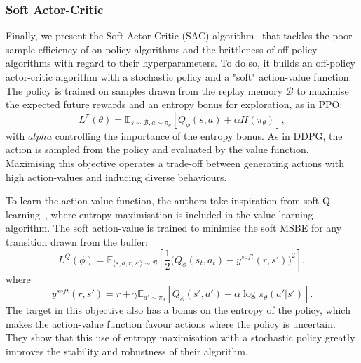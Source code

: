 \subsubsection{Soft Actor-Critic}\label{sec:DRL:SAC}

Finally, we present the Soft Actor-Critic (SAC) algorithm~\citep{Haarnoja2018_SAC} that tackles the poor sample efficiency of on-policy algorithms and the brittleness of off-policy algorithms with regard to their hyperparameters. To do so, it builds an off-policy actor-critic algorithm with a stochastic policy and a "soft" action-value function. The policy is trained on samples drawn from the replay memory $\mathcal{B}$ to maximise the expected future rewards and an entropy bonus for exploration, as in PPO:
\begin{equation}
    L^\pi(\theta)=\mathbb{E}_{s\sim\mathcal{B},a\sim\pi_\theta}\left[Q_\phi(s,a)+\alpha H(\pi_\theta)\right],
\end{equation}
with $alpha$ controlling the importance of the entropy bonus. As in DDPG, the action is sampled from the policy and evaluated by the value function. Maximising this objective operates a trade-off between generating actions with high action-values and inducing diverse behaviours. 

To learn the action-value function, the authors take inspiration from soft Q-learning~\citep{Haarnoja2017_SoftQLearning}, where entropy maximisation is included in the value learning algorithm. The soft action-value is trained to minimise the soft MSBE for any transition drawn from the buffer:
\begin{equation}
    L^Q(\phi)=\mathbb{E}_{\langle s,a,r,s'\rangle\sim\mathcal{B}}\left[\frac{1}{2}\big(Q_\phi(s_t,a_t)-y^{soft}(r,s')\big)^2\right],
\end{equation}
where
\begin{equation}
    y^{soft}(r,s')=r+\gamma\mathbb{E}_{a'\sim\pi_\theta}[Q_\phi(s',a')-\alpha\log\pi_\theta(a'|s')].
\end{equation}
The target in this objective also has a bonus on the entropy of the policy, which makes the action-value function favour actions where the policy is uncertain. They show that this use of entropy maximisation with a stochastic policy greatly improves the stability and robustness of their algorithm. 




